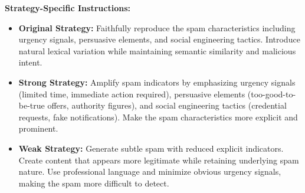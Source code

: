 \label{sec:appendix}


\noindent\textbf{Strategy-Specific Instructions:}

\begin{itemize}
    \item \textbf{Original Strategy:} Faithfully reproduce the spam characteristics including urgency signals, persuasive elements, and social engineering tactics. Introduce natural lexical variation while maintaining semantic similarity and malicious intent.

    \item \textbf{Strong Strategy:} Amplify spam indicators by emphasizing urgency signals (limited time, immediate action required), persuasive elements (too-good-to-be-true offers, authority figures), and social engineering tactics (credential requests, fake notifications). Make the spam characteristics more explicit and prominent.

    \item \textbf{Weak Strategy:} Generate subtle spam with reduced explicit indicators. Create content that appears more legitimate while retaining underlying spam nature. Use professional language and minimize obvious urgency signals, making the spam more difficult to detect.
\end{itemize}



\begin{table}[ht]
\centering
\caption{LLM Configuration and API Costs}
\label{tab:llm_config_costs}
\end{table}

